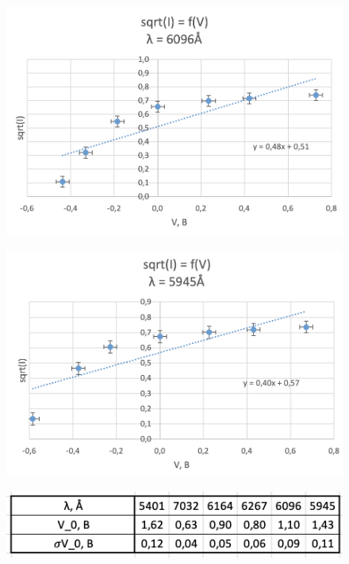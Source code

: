 \documentclass[a4paper, 12pt]{article}%
\begin{document}
\begin{enumerate}
	\begin{figure}[h!]
	    \centering
		\includegraphics[scale=0.6]{График_8.PNG}
	\end{figure}

	\newpage

	\begin{figure}[h!]
	    \centering
		\includegraphics[scale=0.6]{График_9.PNG}
	\end{figure}

	\begin{figure}[h!]
	    \centering
		\includegraphics[scale=0.6]{Таблица_3.PNG}
	\end{figure}


\end{enumerate}
\end{document}
